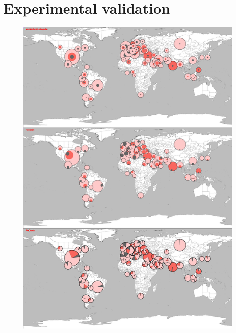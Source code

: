 \documentclass[a4paper,11pt]{article}
\begin{document}
\newpage

\section{Experimental validation}


\begin{figure}[htp]
  \includegraphics[width=\textwidth,height=\textheight,keepaspectratio]{assets/covid19_nested_discs.png}
\end{figure}

\end{document}
